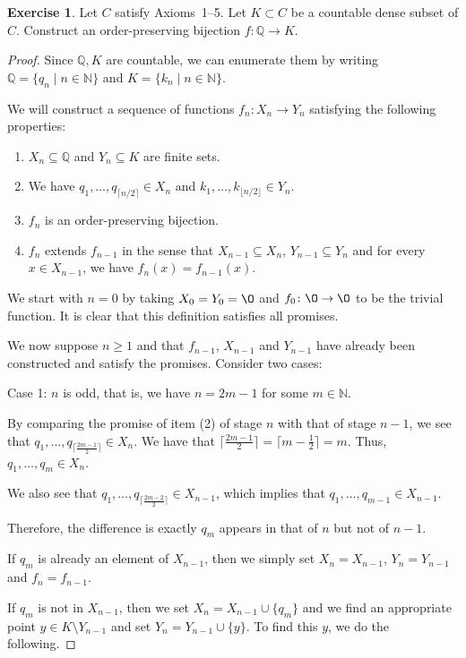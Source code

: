\documentclass[11pt]{article}
\newcommand{\bbN}{\mathbb{N}}
\newcommand{\bbQ}{\mathbb{Q}}
\renewcommand{\emptyset}{\O}
\newcommand{\arr}{\longrightarrow}
\theoremstyle{definition}
\newtheorem{exercise}[theorem]{Exercise}
\numberwithin{equation}{subsection}
\begin{document}
\begin{exercise}
	Let $C$ satisfy Axioms~1--5. Let $K \subset C$ be a countable dense subset of $C$. Construct an order-preserving bijection $f\colon \bbQ \arr K$. 
\begin{proof}
Since $\bbQ, K$ are countable, we can enumerate them by writing $\bbQ = \{q_n \mid n\in \bbN\}$ and $K = \{k_n \mid n\in \bbN\}$.

We will construct a sequence of functions $f_n \colon X_n \rightarrow Y_n$ satisfying the following properties:

\begin{enumerate}
    \item $X_n \subseteq \bbQ$ and $Y_n \subseteq K$ are finite sets.
    \item We have $q_1,\ldots, q_{\lceil n/2\rceil}\in X_n$ and $k_1,\ldots,k_{\lfloor n/2\rfloor}\in Y_n$.
    \item $f_n$ is an order-preserving bijection.
    \item $f_n$ extends $f_{n-1}$ in the sense that $X_{n-1}\subseteq X_n$, $Y_{n-1}\subseteq Y_n$ and for every $x\in X_{n-1}$, we have $f_n(x) = f_{n-1}(x)$.
    
\end{enumerate} 

We start with $n=0$ by taking $X_0 = Y_0 = \emptyset$ and $f_0\colon\emptyset\to\emptyset$ to be the trivial function. It is clear that this definition satisfies all promises.

We now suppose $n\geq 1$ and that $f_{n-1}$, $X_{n-1}$ and $Y_{n-1}$ have already been constructed and satisfy the promises. Consider two cases:

Case 1: $n$ is odd, that is, we have $n = 2m-1$ for some $m\in\mathbb{N}$. 

By comparing the promise of item (2) of stage $n$ with that of stage $n-1$, we see that $q_1,\dots,q_{\lceil \frac{2m-1}{2} \rceil} \in X_n$. We have that $\lceil \frac{2m-1}{2} \rceil = \lceil m-\frac{1}{2} \rceil = m$. Thus, $q_1,\dots,q_m \in X_n$.

We also see that $q_1,\dots,q_{\lceil \frac{2m-2}{2} \rceil} \in X_{n-1}$, which implies that $q_1,\dots,q_{m-1} \in X_{n-1}$. 

Therefore, the difference is exactly $q_m$ appears in that of $n$ but not of $n-1$. 

If $q_m$ is already an element of $X_{n-1}$, then we simply set $X_n = X_{n-1}$, $Y_n = Y_{n-1}$ and $f_n = f_{n-1}$.

If $q_m$ is not in $X_{n-1}$, then we set $X_n = X_{n-1}\cup\{q_m\}$ and we find an appropriate point $y\in K\setminus Y_{n-1}$ and set $Y_n = Y_{n-1}\cup\{y\}$. To find this $y$, we do the following.


\end{proof}
\end{exercise}
\end{document}
